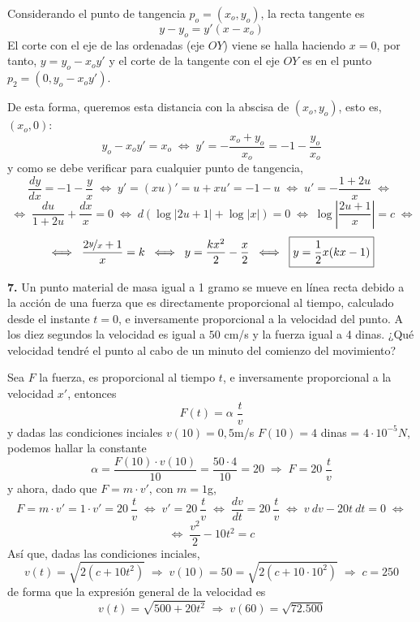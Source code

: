 \begin{sol}
    Considerando el punto de tangencia $p_o=(x_o,y_o)$, la recta tangente es $$y-y_o=y'(x-x_o)$$
    El corte con el eje de las ordenadas (eje $OY$) viene se halla haciendo $x=0$, por tanto, $y=y_o-x_oy'$ y el corte de la tangente con el eje $OY$ es en el punto $p_2=(0,y_o-x_oy')$. 

    De esta forma, queremos esta distancia con la abscisa de $(x_o,y_o)$, esto es, $(x_o,0)$:
    $$y_o-x_oy' = x_o \; \iff \; y'=-\dfrac{x_o+y_o}{x_o}=-1-\dfrac{y_o}{x_o}$$
   y como se debe verificar para cualquier punto de tangencia, 
   $$\dfrac{dy}{dx}=-1-\dfrac{y}{x}\; \iff \;y'=(xu)'=u+xu'=-1-u\; \iff \; u'=-\dfrac{1+2u}{x} \; \iff \; $$
    $$\; \iff \; \dfrac{du}{1+2u}+\dfrac{dx}{x}=0 \; \iff \; d \left( \log|2u+1| + \log |x|  \right)=0 \; \iff \; \log \left| \dfrac{2u+1}{x} \right|=c \; \iff $$
    $$\iff \; \dfrac{2\nicefrac{y}{x}+1}{x}=k \; \iff \; y=\dfrac{kx^2}{2}-\dfrac{x}{2} \; \iff \; \boxed{y=\dfrac{1}{2}x(kx-1)}$$
\end{sol}
\begin{ejer} \textbf{7.}
    Un punto material de masa igual a 1 gramo se mueve en línea recta debido a la acción de una fuerza que es directamente proporcional al tiempo, calculado desde el instante $t = 0$, e inversamente proporcional a la velocidad del punto. A los diez segundos la velocidad es igual a $50$ cm/s y la fuerza igual a 4 dinas. ¿Qué velocidad tendré el punto al cabo de un minuto del comienzo del movimiento?
\end{ejer}
\begin{sol}
Sea $F$ la fuerza, es proporcional al tiempo $t$, e inversamente proporcional a la velocidad $x'$, entonces 
$$F(t)=\alpha \; \dfrac{t}{v}$$
y dadas las condiciones inciales $v(10)=0,5$m/s $F(10)=4$ dinas = $4 \cdot 10^{-5}N$, podemos hallar la constante 
$$\alpha=\dfrac{F(10) \cdot v(10)}{10}=\dfrac{50 \cdot 4}{10}=20 \; \Rightarrow \; F=20 \; \dfrac{t}{v}$$
y ahora, dado que $F=m \cdot v'$, con $m=1$g, 
$$F=m \cdot v'=1 \cdot v'=20\: \dfrac{t}{v} \; \iff \; v'=20 \: \dfrac{t}{v} \; \iff \; \dfrac{dv}{dt}=20 \: \dfrac{t}{v} \; \iff \; v\: dv -20 t \: dt=0 \; \iff$$
$$ \iff \; \dfrac{v^2}{2}-10 t^2=c$$
Así que, dadas las condiciones inciales, 
$$v(t)=\sqrt{2(c+10t^2)} \; \Rightarrow \; v(10)=50=\sqrt{2(c+10 \cdot 10^2)} \; \Rightarrow \; c =250 $$
de forma que la expresión general de la velocidad es 
$$v(t)=\sqrt{500+20t^2} \; \Rightarrow \; v(60)=\sqrt{72.500}$$
\end{sol}
